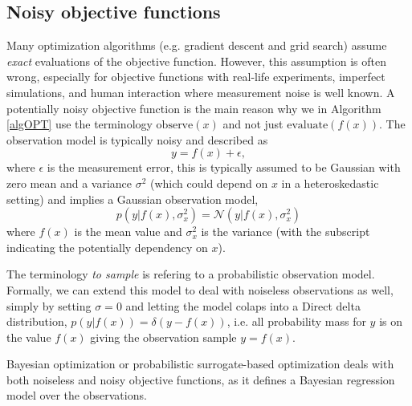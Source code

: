 \subsection{Noisy objective functions}
Many optimization algorithms (e.g. gradient descent and grid search) assume \textit{exact}
evaluations of the objective function. However, this assumption is often wrong, especially for
objective functions with real-life experiments, imperfect simulations, and human interaction where
measurement noise is well known. A potentially noisy objective function is the main reason why we in
Algorithm \eqref{algOPT} use the terminology $\text{observe}(x)$ and not just
$\text{evaluate}(f(x))$. The observation model is typically noisy and described as
$$y = f(x)+\epsilon,$$ where $\epsilon$ is the measurement error, this is
typically assumed to be Gaussian with zero mean and a variance
$\sigma^2$ (which could depend on $x$ in a heteroskedastic setting) and implies a Gaussian observation model, 
$$p(y|f(x),\sigma_x^2) = \mathcal{N}(y|f(x),\sigma_x^2)$$ where $f(x)$ is the mean value and
$\sigma_x^2$ is the variance (with the subscript indicating the potentially dependency on $x$). 
\begin{note2}
    The terminology \textit{to sample} is refering to a probabilistic observation model. Formally, we
    can extend this model to deal with noiseless observations as well, simply by setting
    $\sigma = 0$ and letting the model colaps into a Direct delta distribution, $p(y|f(x)) =
    \mathcal{\delta}(y-f(x))$, i.e. all probability mass for $y$ is on the value $f(x)$ giving the
    observation sample $y = f(x)$. 
\end{note2}


Bayesian optimization or probabilistic surrogate-based optimization deals with both noiseless and noisy objective functions,
as it defines a Bayesian regression model over the observations.

